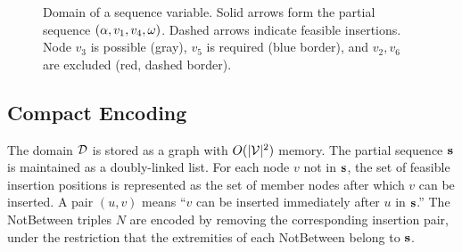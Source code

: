 \documentclass[11pt, a4paper]{scrartcl}
\newcommand{\NB}{N}
\begin{document}
\begin{figure}[t]
    \centering
    \caption{Domain of a sequence variable. Solid arrows form the partial sequence $(\alpha, v_1, v_4, \omega)$. Dashed arrows indicate feasible insertions. Node $v_3$ is possible (gray), $v_5$ is required (blue border), and $v_2, v_6$ are excluded (red, dashed border).}
    \label{fig:seqvar_full}
\end{figure}

\subsection{Compact Encoding}

The domain $\mathcal{D}$ is stored as a graph with $O(|\mathcal{V}|^2)$ memory.
The partial sequence $\mathbf{s}$ is maintained as a doubly-linked list.
For each node $v$ not in $\mathbf{s}$, the set of feasible insertion positions is represented as the set of member nodes after which $v$ can be inserted.
A pair $(u, v)$ means ``$v$ can be inserted immediately after $u$ in $\mathbf{s}$.'' The NotBetween triples $\NB$ are encoded by removing the corresponding insertion pair, under the restriction that the extremities of each NotBetween belong to $\mathbf{s}$.
\end{document}
